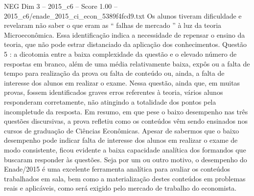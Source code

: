 \begin{textsample}{NEG Dim 3 – 2015\_c6 – Score 1.00 – 2015\_c6/enade\_2015\_ci\_econ\_5389f4fcd9.txt}
Os alunos tiveram dificuldade e revelaram não saber o que eram as “ falhas de mercado ” à luz da teoria Microeconômica.
Essa identificação indica a necessidade de repensar o ensino da teoria, que não pode estrar distanciado da aplicação dos conhecimentos.
Questão 5 : a dicotomia entre a baixa complexidade da questão e o elevado número de respostas em branco, além de uma média relativamente baixa, expôs ou a falta de tempo para realização da prova ou falta de conteúdo ou, ainda, a falta de interesse dos alunos em realizar o exame.
Nessa questão, ainda que, em muitas provas, fossem identificados graves erros referentes à teoria, vários alunos responderam corretamente, não atingindo a totalidade dos pontos pela incompletude da resposta.
Em resumo, em que pese o baixo desempenho nas três questões discursivas, a prova refletiu como os conteúdos vêm sendo ensinados nos cursos de graduação de Ciências Econômicas.
Apesar de sabermos que o baixo desempenho pode indicar falta de interesse dos alunos em realizar o exame de modo consistente, ficou evidente a baixa capacidade analítica dos formandos que buscaram responder às questões.
Seja por um ou outro motivo, o desempenho do Enade/2015 é uma excelente ferramenta analítica para avaliar os conteúdos trabalhados em sala, bem como a materialização destes conteúdos em problemas reais e aplicáveis, como será exigido pelo mercado de trabalho do economista.

\end{textsample}
